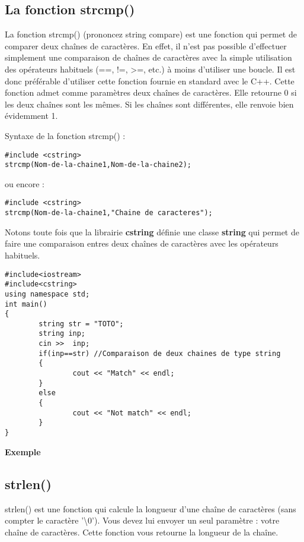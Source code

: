 \documentclass[a4paper, oneside,11pt]{book}
\begin{document}
\subsection{La fonction strcmp()}

La fonction strcmp() (prononcez string compare) est une fonction qui permet de comparer
deux cha\^ines de caract\`eres. En effet, il n'est pas possible d'effectuer simplement une
comparaison de cha\^ines de caract\`eres avec la simple utilisation des op\'erateurs
habituels (==, !=, >=, etc.) \`a moins d'utiliser une boucle. Il est donc pr\'ef\'erable
d'utiliser cette fonction fournie en standard avec le C++. Cette fonction admet comme param\`etres deux cha\^ines
de caract\`eres. Elle retourne 0 si les deux cha\^ines sont les m\^emes. Si les cha\^ines
sont diff\'erentes, elle renvoie bien \'evidemment 1. 

Syntaxe de la fonction strcmp() :

\begin{lstlisting}
#include <cstring>
strcmp(Nom-de-la-chaine1,Nom-de-la-chaine2);
\end{lstlisting}

ou encore :

\begin{lstlisting}
#include <cstring>
strcmp(Nom-de-la-chaine1,"Chaine de caracteres");
\end{lstlisting}


Notons toute fois que la librairie \textbf{cstring} d\'efinie une classe 
\textbf{string} qui permet de faire une comparaison entres deux cha\^ines 
de caract\`eres avec les op\'erateurs habituels.

\begin{lstlisting}
#include<iostream>
#include<cstring>
using namespace std;
int main()
{
        string str = "TOTO";
        string inp;
        cin >>  inp;
        if(inp==str) //Comparaison de deux chaines de type string
        {
                cout << "Match" << endl;
        }
        else
        {
                cout << "Not match" << endl;
        }
}
\end{lstlisting}

\textbf{Exemple}



\subsection{strlen()}
strlen() est une fonction qui calcule la longueur d'une cha\^ine de caract\`eres (sans compter le caract\`ere '\textbackslash 0').
Vous devez lui envoyer un seul param\`etre : votre cha\^ine de caract\`eres. Cette fonction vous retourne la longueur de la cha\^ine.
\end{document}
